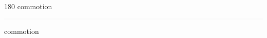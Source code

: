 
\begin{frame}
\begin{center}
\begin{turn}{180}
{\fontsize{2.5cm}{1em}\selectfont commotion}
\end{turn}
\vspace{1em}\par  
\hrule
\vspace{1em}\par  
{\fontsize{2.5cm}{1em}\selectfont commotion}
\end{center}
\end{frame}
